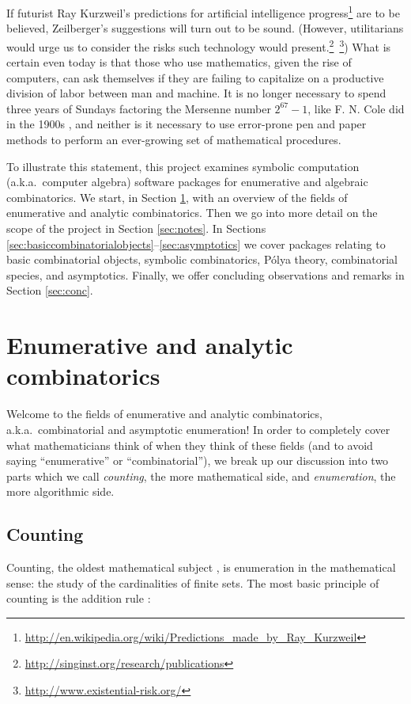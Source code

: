 \documentclass[12pt]{article}
\theoremstyle{plain}
\begin{document}
If futurist Ray Kurzweil's predictions for artificial intelligence progress\footnote{
\url{http://en.wikipedia.org/wiki/Predictions_made_by_Ray_Kurzweil}
}
are to be believed, Zeilberger's suggestions will turn out to be sound.
(However, utilitarians would urge us to consider the risks such technology would present.\footnote{
 \url{http://singinst.org/research/publications}
}\ \footnote{
 \url{http://www.existential-risk.org/}
})
What is certain even today is that those who use mathematics,
given the rise of computers,
can ask themselves if they are failing to capitalize on a productive division of labor between man and machine.
\hypertarget{started}{It}
 is no longer necessary to spend three years of Sundays factoring the Mersenne number \(2^{67}-1\), like F. N. Cole did in the 1900s \cite{cole},
and neither is it necessary to use error-prone pen and paper methods to perform an ever-growing set of mathematical procedures.

To illustrate this statement, this project examines symbolic computation (a.k.a.\ computer algebra) software packages for enumerative and algebraic combinatorics.
We start, in Section \ref{sec:Enumerativeandanalyticcombinatorics}, with an overview of the fields of enumerative and analytic combinatorics.
Then we go into more detail on the scope of the project in Section \ref{sec:notes}.
In Sections \ref{sec:basiccombinatorialobjects}--\ref{sec:asymptotics} we cover packages relating to
basic combinatorial objects,
symbolic combinatorics,
P\'olya theory,
combinatorial species, and
asymptotics.
Finally, we offer concluding observations and remarks in Section \ref{sec:conc}.



\section{Enumerative and analytic combinatorics}
\label{sec:Enumerativeandanalyticcombinatorics}
Welcome to the fields of enumerative and analytic combinatorics, a.k.a.\ combinatorial and asymptotic enumeration!
In order to completely cover what mathematicians think of when they think of these fields
(and to avoid saying ``enumerative'' or ``combinatorial''),
we break up our discussion into two parts which we call \emph{counting}, the more mathematical side, and \emph{enumeration}, the more algorithmic side.

\subsection{Counting}
Counting, the oldest mathematical subject \cite{companion}, is enumeration in the mathematical sense:  the study of the cardinalities of finite sets.
The most basic principle of counting is the addition rule \cite{feng}:
\end{document}
